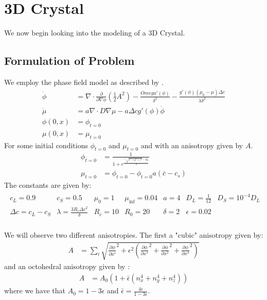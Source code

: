 \section{3D Crystal}
We now begin looking into the modeling of a 3D Crystal.
\subsection{Formulation of Problem}
We employ the phase field model as described by \cite{Bollada2023}.
\begin{align*}
    \dot \phi &= \nabla \cdot \frac{\partial}{\partial \nabla \phi}(\frac12 A^2)-\frac{Omega'(\phi)}{\delta^2} - \frac{g'(\phi)(\mu_0-\mu)\Delta c}{\lambda \delta^2}\\
    \dot \mu &= a\nabla \cdot D \nabla \mu - a \Delta c g'(\phi)\dot \phi\\
    \phi(0,x) &= \phi_{t=0}\\
    \mu(0,x) &= \mu_{t=0}
\end{align*}
For some initial conditions $\phi_{t=0}$ and $\mu_{t=0}$ and with an anisotropy given by $A$.
\begin{align*}
    \phi_{t=0} &= \frac{1}{1+e^{\frac{-\sqrt{x^2 + y^2 + z^2}-R_0}{\delta}}}\\
    \mu_{t=0} &= \phi_{t=0} - \phi_{t=0}a(\bar c - c_s)
\end{align*}
The constants are given by:
\begin{align*}
    \begin{matrix}
    c_L = 0.9 & c_S = 0.5 & \mu_0 = 1 & \mu_{\inf} = 0.04 & a = 4 & D_L= \frac{1}{12} & D_S = 10^{-4}D_L\\
    \Delta c = c_L - c_S & \lambda = \frac{3R_c\Delta c^2}{\delta} & R_c = 10 & R_0 = 20 & \delta = 2 & \epsilon = 0.02\\
    \end{matrix}
\end{align*}

We will observe two different anisotropies.
The first a "cubic" anisotropy given by:
\begin{align*}
    A &= \sum_i \sqrt{\frac{\partial \phi}{\partial x^i}^2 + \epsilon^2(\frac{\partial \phi}{\partial x^1}^2 + \frac{\partial \phi}{\partial x^2}^2 + \frac{\partial \phi}{\partial x^3}^2)}
\end{align*}
and an octohedral anisotropy given by \cite{Bollada2015}:
\begin{align*}
    A &= A_0 (1 + \bar \epsilon(n^4_x+n^4_y+n^4_z))
\end{align*}
where we have that $A_0 =1 -3\epsilon$ and $\bar \epsilon = \frac{4\epsilon}{1-3\epsilon}$.


